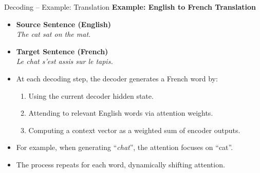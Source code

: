 \begin{frame}{Decoding -- Example: Translation}
\textbf{Example: English to French Translation}

\vspace{0.7em}

\begin{itemize}
  \item[] \textbf{Source Sentence (English)}\\
  \textit{The cat sat on the mat.}
  \vspace{0.3em}
  \item[] \textbf{Target Sentence (French)}\\
  \textit{Le chat s'est assis sur le tapis.}
\end{itemize}

\vspace{0.4em}

\begin{itemize}
  \item[$\blacktriangleright$] At each decoding step, the decoder generates a French word by:
    \begin{enumerate}
      \item Using the current decoder hidden state.
      \item Attending to relevant English words via attention weights.
      \item Computing a context vector as a weighted sum of encoder outputs.
    \end{enumerate}
  \item[$\blacktriangleright$] For example, when generating ``\textit{chat}'', the attention focuses on ``cat''.
  \item[$\blacktriangleright$] The process repeats for each word, dynamically shifting attention.
\end{itemize}

\end{frame}
